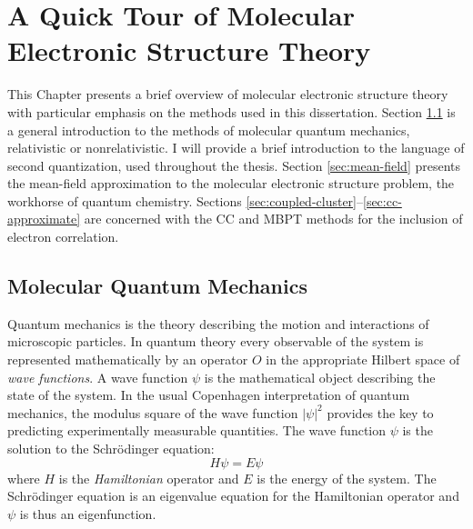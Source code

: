 
\renewcommand{\thefigure}{\arabic{chapter}.\arabic{figure}}

\chapter{A Quick Tour of Molecular Electronic Structure Theory}\label{ch:QM}

\begin{epigraphs}
\setlength\epigraphwidth{7.5cm}
\setlength\epigraphwidth{7cm}
\end{epigraphs}

This Chapter presents a brief overview of molecular electronic structure
theory with particular emphasis on the methods used in this dissertation.
Section \ref{sec:mqm} is a general introduction to the methods of
molecular quantum mechanics, relativistic or nonrelativistic.
I will provide a brief introduction to the language of second
quantization, used throughout the thesis.
Section \ref{sec:mean-field} presents the mean-field approximation to
the molecular electronic structure problem, the workhorse of quantum
chemistry.
Sections \ref{sec:coupled-cluster}--\ref{sec:cc-approximate} are
concerned with the \gls{CC} and \gls{MBPT} methods for the inclusion of
electron correlation.

\section{Molecular Quantum Mechanics}\label{sec:mqm}

Quantum mechanics is the theory describing the motion and interactions
of microscopic particles. In quantum theory every observable of the
system is represented mathematically by an operator $O$ in the
appropriate Hilbert space of \emph{wave functions}.
A wave function $\psi$ is the mathematical object describing the state of the
system. In the usual Copenhagen interpretation of quantum mechanics, the
modulus square of the wave function $|\psi|^2$ provides the key to
predicting experimentally measurable quantities.\autocite{Konishi2009-zb}
The wave function $\psi$ is the solution to the Schr\"{o}dinger equation:
\begin{equation}\label{eq:schrodinger}
  H\psi = E\psi
\end{equation}
where $H$ is the \emph{Hamiltonian} operator and $E$ is the energy of
the system. The Schr\"{o}dinger equation is an eigenvalue equation for
the Hamiltonian operator and $\psi$ is thus an
eigenfunction.\autocite{Arfken2013-pt}

